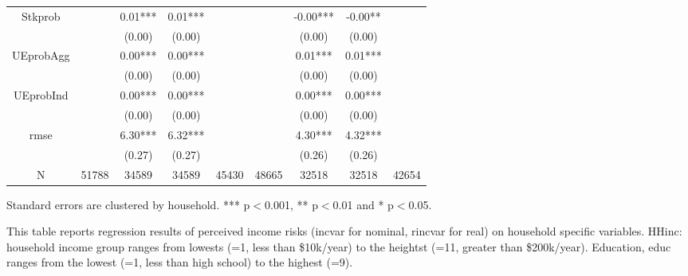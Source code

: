 \begin{table}[p]
\begin{adjustbox}{width=\textwidth}
\begin{threeparttable}
\begin{tabular}{ccccccccc}
Stkprob          &           &   0.01*** &    0.01*** &             &           &   -0.00*** &     -0.00** &              \\
                 &           &    (0.00) &     (0.00) &             &           &     (0.00) &      (0.00) &              \\
UEprobAgg        &           &   0.00*** &    0.00*** &             &           &    0.01*** &     0.01*** &              \\
                 &           &    (0.00) &     (0.00) &             &           &     (0.00) &      (0.00) &              \\
UEprobInd        &           &   0.00*** &    0.00*** &             &           &    0.00*** &     0.00*** &              \\
                 &           &    (0.00) &     (0.00) &             &           &     (0.00) &      (0.00) &              \\
rmse             &           &   6.30*** &    6.32*** &             &           &    4.30*** &     4.32*** &              \\
                 &           &    (0.27) &     (0.27) &             &           &     (0.26) &      (0.26) &              \\
N                &     51788 &     34589 &      34589 &       45430 &     48665 &      32518 &       32518 &        42654 \\
\bottomrule
\end{tabular}
\begin{tablenotes}\item Standard errors are clustered by household. *** p$<$0.001, ** p$<$0.01 and * p$<$0.05. 
\item This table reports regression results of perceived income risks (incvar for nominal, rincvar for real) on household specific variables. HHinc: household income group ranges from lowests (=1, less than \$10k/year) to the heightst (=11, greater than \$200k/year). Education, educ ranges from the lowest (=1, less than high school) to the highest (=9).
\end{tablenotes}
\end{threeparttable}
\end{adjustbox}
\end{table}